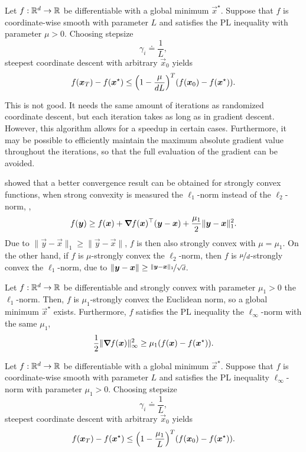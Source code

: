 \begin{theorem}
    Let $f: \R^d \to \R$ be differentiable with a global minimum $\vec{x}^\star$. Suppose that $f$ is coordinate-wise smooth with parameter $L$ and satisfies the PL inequality with parameter $\mu > 0$. Choosing stepsize \[
        \gamma_i \doteq \frac{1}{L},
    \]
    steepest coordinate descent with arbitrary $\vec{x}_0$ yields \[
        f(\vec{x}_T) - f(\vec{x}^\star) \leq \lft( 1 - \frac{\mu}{dL} \rgt)^T (f(\vec{x}_0) - f(\vec{x}^\star)).
    \]
\end{theorem}

This is not good. It needs the same amount of iterations as randomized coordinate descent, but each
iteration takes as long as in gradient descent. However, this algorithm allows for a
speedup in certain cases. Furthermore, it may be possible to efficiently maintain the maximum
absolute gradient value throughout the iterations, so that the full evaluation of the gradient can
be avoided.

\cite{nutini2015coordinate} showed that a better convergence result can be obtained for strongly
convex functions, when strong convexity is measured \wrt the $\ell_1$-norm instead of the
$\ell_2$-norm, \ie, \[
    f(\vec{y}) \geq f(\vec{x}) + \transpose{\grad{f(\vec{x})}{}} (\vec{y}-\vec{x}) + \frac{\mu_1}{2} \|\vec{y} - \vec{x}\|_1^2.
\]
Due to $\| \vec{y} - \vec{x} \|_1 \geq \| \vec{y} - \vec{x} \|$, $f$ is then also strongly convex
with $\mu = \mu_1$. On the other hand, if $f$ is $\mu$-strongly convex \wrt the $\ell_2$-norm, then
$f$ is $\nicefrac{\mu}{d}$-strongly convex \wrt the $\ell_1$-norm, due to $\|\vec{y}-\vec{x}\| \geq
    \nicefrac{\|\vec{y}-\vec{x}\|_1}{\sqrt{d}}$.

\begin{lemma}
    Let $f: \R^d \to \R$ be differentiable and strongly convex with parameter $\mu_1 > 0$ \wrt the
    $\ell_1$-norm. Then, $f$ is $\mu_1$-strongly convex \wrt the Euclidean norm, so a global minimum
    $\vec{x}^\star$ exists. Furthermore, $f$ satisfies the PL inequality \wrt the $\ell_{\infty}$-norm with the same $\mu_1$, \[
        \frac{1}{2} \| \grad{f(\vec{x})}{} \|_{\infty}^2 \geq \mu_1 (f(\vec{x}) - f(\vec{x}^\star)).
    \]
\end{lemma}

\begin{theorem}
    Let $f: \R^d \to \R$ be differentiable with a global minimum $\vec{x}^\star$. Suppose that $f$ is
    coordinate-wise smooth with parameter $L$ and satisfies the PL inequality \wrt $\ell_{\infty}$-norm
    with parameter $\mu_1 > 0$. Choosing stepsize \[
        \gamma_i \doteq \frac{1}{L},
    \]
    steepest coordinate descent with arbitrary $\vec{x}_0$ yields \[
        f(\vec{x}_T) - f(\vec{x}^\star) \leq \lft( 1 - \frac{\mu_1}{L} \rgt)^T (f(\vec{x}_0) - f(\vec{x}^\star)).
    \]
\end{theorem}

